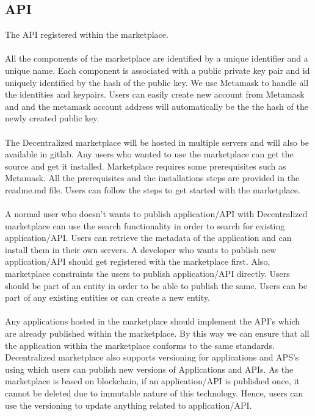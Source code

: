 \subsection{API}
The API registered within the marketplace.
\\
\\
All the components of the marketplace are identified by a unique identifier and a unique name. Each component is associated with a public private key pair and id uniquely identified by the hash of the public key. We use Metamask to handle all the identities and keypairs. Users can easily create new account from Metamask and and the metamask account address will automatically be the the hash of the newly created public key.
\\
\\
The Decentralized marketplace will be hosted in multiple servers and will also be available in gitlab. Any users who wanted to use the marketplace can get the source and get it installed. Marketplace requires some prerequisites such as Metamask. All the prerequisites and the installations steps are provided in the readme.md file. Users can follow the steps to get started with the marketplace.
\\
\\
A normal user who doesn't wants to publish application/API with Decentralized marketplace can use the search functionality in order to search for existing  application/API. Users can retrieve the metadata of the application and can install them in their own servers. A developer who wants to publish new application/API should get registered with the marketplace first. Also, marketplace constraints the users to publish application/API directly. Users should be part of an entity in order to be able to publish the same. Users can be part of any existing entities or can create a new entity.
\\
\\
Any applications hosted in the marketplace should implement the API's which are already published within the marketplace. By this way we can ensure that all the application within the marketplace conforms to the same standards. Decentralized marketplace also supports versioning for applications and APS's using which users can publish new versions of Applications and APIs. As the marketplace is based on blockchain, if an application/API is published once, it cannot be deleted due to immutable nature of this technology. Hence, users can use the versioning to update anything related to application/API.   
\\
\\
